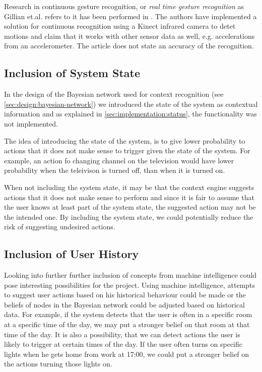 Research in continuous gesture recognition, or \emph{real time gesture recognition} as Gillian et.al. refers to it has been performed in \cite{gillian2014gesture}. The authors have implemented a solution for continuous recognition using a Kinect infrared camera to detet motions and claim that it works with other sensor data as well, e.g. accelerations from an accelerometer. The article does not state an accuracy of the recognition.

\subsection{Inclusion of System State}

In the design of the Bayesian network used for context recognition (see \ref{sec:design:bayesian-network}) we introduced the state of the system as contextual information and as explained in \cref{sec:implementation:status}, the functionality was not implemented.

The idea of introducing the state of the system, is to give lower probability to actions that it does not make sense to trigger given the state of the system. For example, an action fo changing channel on the television would have lower probability when the teleivison is turned off, than when it is turned on. 

When not including the system state, it may be that the context engine suggests actions that it does not make sense to perform and since it is fair to assume that the user knows at least part of the system state, the suggested action may not be the intended one. By including the system state, we could potentially reduce the risk of suggesting undesired actions.

\subsection{Inclusion of User History}

Looking into further further inclusion of concepts from machine intelligence could pose interesting possibilities for the project. Using machine intelligence, attempts to suggest user actions based on his historical behaviour could be made or the beliefs of nodes in the Bayesian network could be adjusted based on historical data. For example, if the system detects that the user is often in a specific room at a specific time of the day, we may put a stronger belief on that room at that time of the day. It is also a possibility, that we can detect actions the user is likely to trigger at certain times of the day. If the user often turns on specific lights when he gets home from work at 17:00, we could put a stronger belief on the actions turning those lights on.


